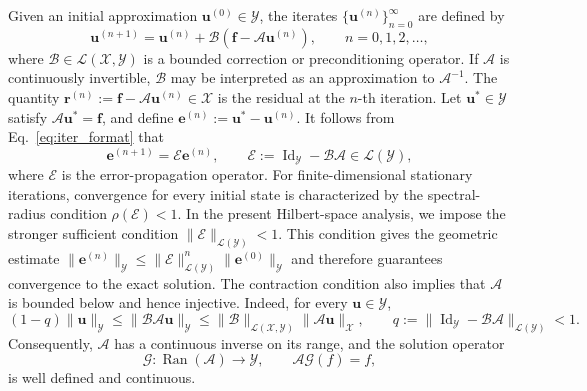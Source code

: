 \documentclass[preprint,numbers,sort&compress]{elsarticle}
\begin{document}
		Given an initial approximation $\boldsymbol u^{(0)}\in\mathcal Y$, the iterates $\{\boldsymbol u^{(n)}\}_{n=0}^{\infty}$ are defined by
		\begin{equation}
			\label{eq:iter_format}
			\boldsymbol u^{(n+1)}
			=
			\boldsymbol u^{(n)}
			+
			\mathcal B
			\left(
			\boldsymbol f-\mathcal A\boldsymbol u^{(n)}
			\right),
			\qquad n=0,1,2,\ldots,
		\end{equation}
		where $\mathcal B\in\mathcal L(\mathcal X,\mathcal Y)$ 
		is a bounded correction or preconditioning operator. If $\mathcal A$ is continuously invertible, $\mathcal B$ may be interpreted as an approximation to $\mathcal A^{-1}$. The quantity
		$\boldsymbol r^{(n)} := \boldsymbol f-\mathcal A\boldsymbol u^{(n)}
		\in\mathcal X$ 
		is the residual at the $n$-th iteration. Let $\boldsymbol u^*\in\mathcal Y$ satisfy
		$\mathcal A\boldsymbol u^*=\boldsymbol f$, and define $\boldsymbol e^{(n)}:= \boldsymbol u^*-\boldsymbol u^{(n)}$. 
		It follows from Eq.~\eqref{eq:iter_format} that 
		\[
		\boldsymbol e^{(n+1)}
		=
		\mathcal E\boldsymbol e^{(n)},
		\qquad
		\mathcal E
		:=
		\operatorname{Id}_{\mathcal Y}
		-
		\mathcal B\mathcal A
		\in\mathcal L(\mathcal Y),
		\]
		where $\mathcal E$ is the error-propagation operator.
		For finite-dimensional stationary iterations, convergence for every initial
		state is characterized by the spectral-radius condition
		$\rho(\mathcal E)<1$. In the present Hilbert-space analysis, we impose the
		stronger sufficient condition $\|\mathcal E\|_{\mathcal L(\mathcal Y)}<1$. This condition gives the geometric estimate $\|\boldsymbol e^{(n)}\|_{\mathcal Y}
		\leq
		\|\mathcal E\|_{\mathcal L(\mathcal Y)}^n
		\|\boldsymbol e^{(0)}\|_{\mathcal Y}$ 
		and therefore guarantees convergence to the exact solution. The contraction condition also implies that
		$\mathcal A$ is bounded below and hence injective. Indeed, for every $\boldsymbol u\in\mathcal Y$,
		\[
		(1-q)\|\boldsymbol u\|_{\mathcal Y}
		\le
		\|\mathcal B\mathcal A\boldsymbol u\|_{\mathcal Y}
		\le
		\|\mathcal B\|_{\mathcal L(\mathcal X,\mathcal Y)}
		\|\mathcal A\boldsymbol u\|_{\mathcal X},
		\qquad
		q:=\|\operatorname{Id}_{\mathcal Y}
		-\mathcal B\mathcal A\|_{\mathcal L(\mathcal Y)}<1.
		\]
		Consequently, $\mathcal A$ has a continuous inverse on its range, and the solution operator
		\[
		\mathcal G: \operatorname{Ran}(\mathcal A)\to\mathcal Y,
		\qquad
		\mathcal A\mathcal G(f)=f,
		\]
		is well defined and continuous.
		
\end{document}
